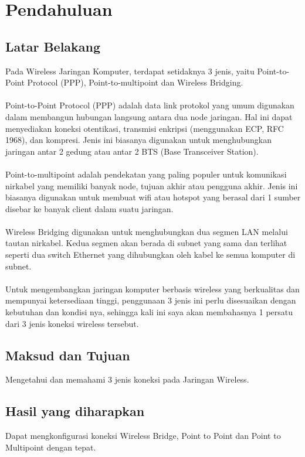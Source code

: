\section{Pendahuluan}
\subsection{Latar Belakang}
Pada Wireless Jaringan Komputer, terdapat setidaknya 3 jenis, yaitu Point-to-Point Protocol
(PPP), Point-to-multipoint dan Wireless Bridging.\\\\
Point-to-Point Protocol (PPP) adalah data link protokol yang umum digunakan dalam
membangun hubungan langsung antara dua node jaringan. Hal ini dapat menyediakan koneksi
otentikasi, transmisi enkripsi (menggunakan ECP, RFC 1968), dan kompresi. Jenis ini
biasanya digunakan untuk menghubungkan jaringan antar 2 gedung atau antar 2 BTS (Base
Transceiver Station).\\\\
Point-to-multipoint adalah pendekatan yang paling populer untuk komunikasi nirkabel yang
memiliki banyak node, tujuan akhir atau pengguna akhir. Jenis ini biasanya digunakan untuk
membuat wifi atau hotspot yang berasal dari 1 sumber disebar ke banyak client dalam suatu
jaringan.\\\\
Wireless Bridging digunakan untuk menghubungkan dua segmen LAN melalui tautan
nirkabel. Kedua segmen akan berada di subnet yang sama dan terlihat seperti dua switch
Ethernet yang dihubungkan oleh kabel ke semua komputer di subnet.\\\\
Untuk mengembangkan jaringan komputer berbasis wireless yang berkualitas dan mempunyai
ketersediaan tinggi, penggunaan 3 jenis ini perlu disesuaikan dengan kebutuhan dan kondisi
nya, sehingga kali ini saya akan membahasnya 1 persatu dari 3 jenis koneksi wireless
tersebut.

\subsection{Maksud dan Tujuan}
Mengetahui dan memahami 3 jenis koneksi pada Jaringan Wireless.

\subsection{Hasil yang diharapkan}
Dapat mengkonfigurasi koneksi Wireless Bridge, Point to Point dan Point to Multipoint
dengan tepat.

